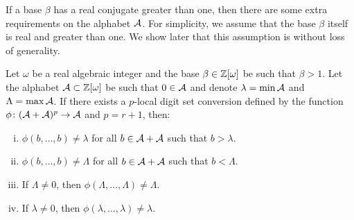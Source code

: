 If a base $\beta$ has a real conjugate greater than one, then there are some extra requirements on the alphabet $\mathcal{A}$. For simplicity, we assume that the base $\beta$ itself is real and greater than one. We show later that this assumption is without loss of generality.
\begin{lem}
\label{lem:alphabetRestrictions}
Let $\omega$ be a real algebraic integer and the base $\beta\in\mathbb{Z}[\omega]$ be such that $\beta>1$. Let the alphabet $\mathcal{A}\subset\mathbb{Z}[\omega]$ be such that $0\in\mathcal{A}$ and denote $\lambda=\min \mathcal{A}$ and $\Lambda=\max \mathcal{A}$. If there exists a $p$-local digit set conversion defined by the function $\phi\colon (\mathcal{A}+\mathcal{A})^p\rightarrow \mathcal{A}$ and $p=r+1$, then:
\begin{enumerate}[i)]
	\item $\phi(b,\dots,b)\neq \lambda$ for all $b\in\mathcal{A}+\mathcal{A}$ such that $b>\lambda$.
	\item $\phi(b,\dots,b)\neq \Lambda$ for all $b\in\mathcal{A}+\mathcal{A}$ such that $b<\Lambda$.
	\item If $\Lambda\neq 0$, then $\phi(\Lambda,\dots,\Lambda)\neq \Lambda$.
	\item If $\lambda\neq 0$, then $\phi(\lambda,\dots,\lambda)\neq \lambda$.
\end{enumerate}
\end{lem}

